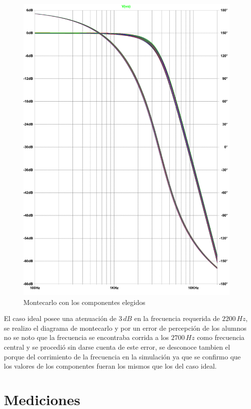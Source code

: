 \begin{figure}[H]
	\centering
	\includegraphics[scale=0.5]{../Ex1/Informe/montecarlobesselMAL.pdf}
	\caption{Montecarlo con los componentes elegidos}
	\label{fig:montecarlobessel}
\end{figure}

	El caso ideal posee una atenuación de $3 \, dB$ en la frecuencia requerida de $2200 \, Hz$, se realizo el diagrama de montecarlo y por un error de percepción de los alumnos no se noto que la frecuencia se encontraba corrida a los $2700 \, Hz$ como frecuencia central y se procedió sin darse cuenta de este error, se desconoce tambien el porque del corrimiento de la frecuencia en la simulación ya que se confirmo que los valores de los componentes fueran los mismos que los del caso ideal.
\section{Mediciones}
	
